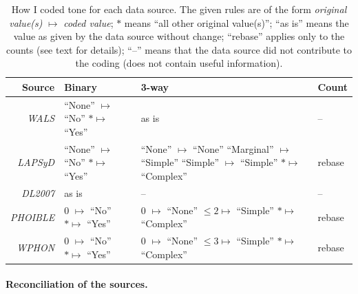 \documentclass[twoside,onecolumn]{article}
\begin{document}
\begin{table}[h]
  \caption{How I coded tone for each data source. The given rules are of the form \textit{original value(s)}  $\mapsto$ \textit{coded value}; $\ast$ means ``all other original value(s)''; ``as is'' means the value as given by the data source without change; ``rebase'' applies only to the counts (see text for details); ``--'' means that the data source did not contribute to the coding (does not contain useful information).}
  \label{Tab:tone_coding_rules}
  \centering
  \begin{tabularx}{\textwidth}{|r|X|X|X|}
    \toprule
    \textbf{Source} & \textbf{Binary} & \textbf{3-way} & \textbf{Count} \\
    \midrule
    \textit{WALS} & \makecell[l]{``None'' $\mapsto$ ``No''\\ $\ast \mapsto$ ``Yes''} & as is & -- \\
    \midrule
    \textit{LAPSyD} & \makecell[l]{``None'' $\mapsto$ ``No''\\ $\ast \mapsto$ ``Yes''} & \makecell[l]{``None'' $\mapsto$ ``None''\\``Marginal'' $\mapsto$ ``Simple''\\``Simple'' $\mapsto$ ``Simple''\\ $\ast \mapsto$ ``Complex''} & rebase \\
    \midrule
    \textit{DL2007} & as is & -- & -- \\
    \midrule
    \textit{PHOIBLE} & \makecell[l]{0 $\mapsto$ ``No''\\ $\ast \mapsto$ ``Yes''} & \makecell[l]{0 $\mapsto$ ``None''\\ $\leq 2 \mapsto$ ``Simple''\\ $\ast \mapsto$ ``Complex''} & rebase \\
    \midrule
    \textit{WPHON} & \makecell[l]{0 $\mapsto$ ``No''\\ $\ast \mapsto$ ``Yes''} & \makecell[l]{0 $\mapsto$ ``None''\\ $\leq 3 \mapsto$ ``Simple''\\ $\ast \mapsto$ ``Complex''} & rebase \\
    \bottomrule
  \end{tabularx}
\end{table}

\paragraph{Reconciliation of the sources.}
\end{document}
